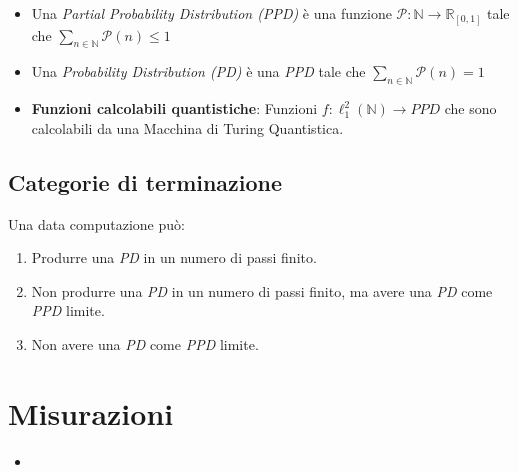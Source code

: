 \documentclass{beamer}
\begin{document}
\begin{frame}{\secname}{}
	\begin{itemize}
		\item Una \textit{Partial Probability Distribution (PPD)} è una funzione \( \mathcal{P} : \mathbb{N} \rightarrow \mathbb{R}_{[0,1]} \) tale che \( \sum_{n \in \mathbb{N}} \mathcal{P} \left ( n \right ) \le 1 \)
		\item Una \textit{Probability Distribution (PD)} è una \textit{PPD} tale che \( \sum_{n \in \mathbb{N}} \mathcal{P} \left ( n \right ) = 1 \)
		\item \textbf{Funzioni calcolabili quantistiche}: Funzioni \( f : \ell^{2}_{1} \left ( \mathbb{N} \right ) \rightarrow PPD \) che sono calcolabili da una Macchina di Turing Quantistica.
	\end{itemize}
\end{frame}

\subsection{Categorie di terminazione}

\begin{frame}{\subsecname}{}
	Una data computazione può:
	\begin{enumerate}
		\item Produrre una \textit{PD} in un numero di passi finito.
		\item Non produrre una \textit{PD} in un numero di passi finito, ma avere una \textit{PD} come \textit{PPD} limite.
		\item Non avere una \textit{PD} come \textit{PPD} limite.
	\end{enumerate}
\end{frame}

\section{Misurazioni}

\begin{frame}{\secname}{}
	\begin{itemize}
		\item
	\end{itemize}
\end{frame}
\end{document}
